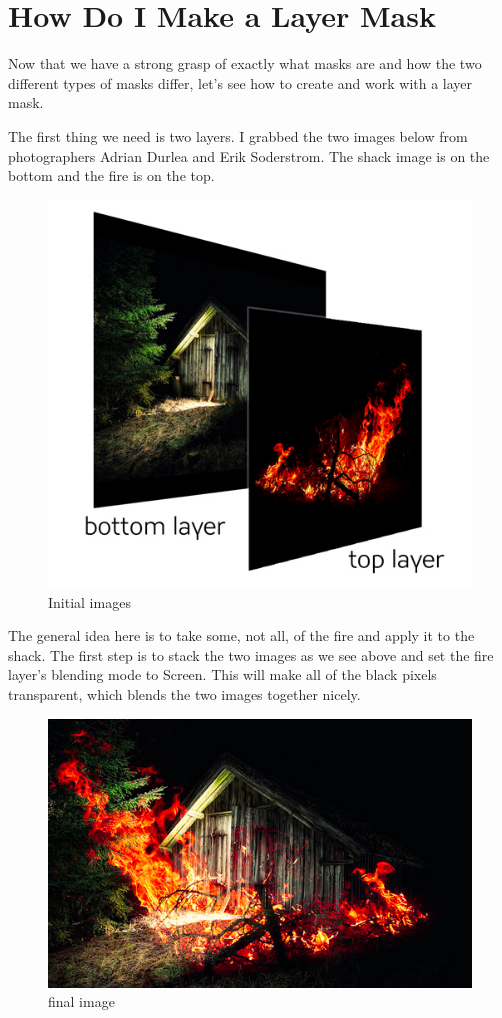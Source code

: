 \section{How Do I Make a Layer Mask}
Now that we have a strong grasp of exactly what masks are and how the two different types of masks differ, let’s see how to create and work with a layer mask.

The first thing we need is two layers. I grabbed the two images below from photographers Adrian Durlea and Erik Soderstrom. The shack image is on the bottom and the fire is on the top.

\begin{figure}
\centering
\includegraphics[width=0.7\linewidth]{Photos/masking_begin}
\caption{Initial images}
\label{fig:masking_begin}
\end{figure}

The general idea here is to take some, not all, of the fire and apply it to the shack. The first step is to stack the two images as we see above and set the fire layer’s blending mode to Screen. This will make all of the black pixels transparent, which blends the two images together nicely.

\begin{figure}
\centering
\includegraphics[width=0.7\linewidth]{Photos/masking_final}
\caption{final image}
\label{fig:masking_final}
\end{figure}

